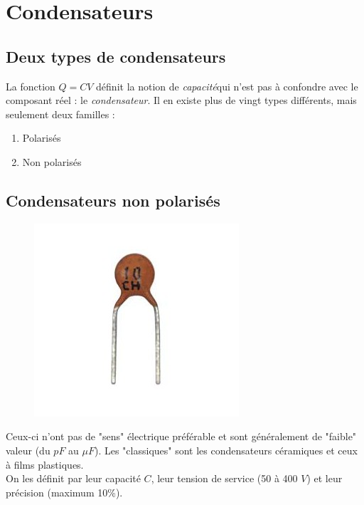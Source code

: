 \documentclass	[11pt, a4paper, openany]{book}
\begin{document}
\section{Condensateurs}
\subsection{Deux types de condensateurs}
La fonction $Q = CV$ définit la notion de \textit{capacité}qui n'est pas à confondre avec le composant réel : le \textit{condensateur}. Il en existe plus de vingt types différents, mais seulement deux familles : 
\begin{enumerate}
\item Polarisés
\item Non polarisés
\end{enumerate}

\subsection{Condensateurs non polarisés}
\begin{figure}
\includegraphics[scale=0.2]{img/image33}
\end{figure}
Ceux-ci n'ont pas de "sens" électrique préférable et sont généralement de "faible" valeur (du $pF$ au $\mu F$). Les "classiques" sont les condensateurs céramiques et ceux à films plastiques.\\

On les définit par leur capacité $C$, leur tension de service (50 à 400 $V$) et leur précision (maximum 10\%).

\newpage
\end{document}
